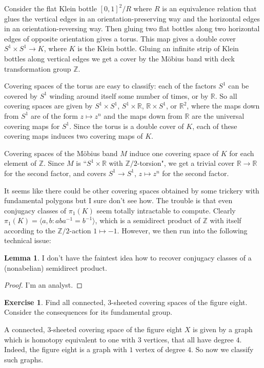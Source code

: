 \documentclass[10pt]{article}
\newcommand{\ZZ}{\mathbb{Z}}
\newcommand{\RR}{\mathbb{R}}
\theoremstyle{definition}
\newtheorem{exer}{Exercise}
\newtheorem{lemma}{Lemma}[exer]
\begin{document}
Consider the flat Klein bottle $[0, 1]^2/R$ where $R$ is an equivalence relation that glues the vertical edges in an orientation-preserving way and the horizontal edges in an orientation-reversing way.
Then gluing two flat bottles along two horizontal edges of opposite orientation gives a torus.
This map gives a double cover $S^1 \times S^1 \to K$, where $K$ is the Klein bottle.
Gluing an infinite strip of Klein bottles along vertical edges we get a cover by the M\"obius band with deck transformation group $\ZZ$.

Covering spaces of the torus are easy to classify: each of the factors $S^1$ can be covered by $S^1$ winding around itself some number of times, or by $\RR$. So all covering spaces are given by $S^1 \times S^1$, $S^1 \times \RR$, $\RR \times S^1$, or $\RR^2$, where the maps down from $S^1$ are of the form $z \mapsto z^n$ and the maps down from $\RR$ are the universal covering maps for $S^1$.
Since the torus is a double cover of $K$, each of these covering maps induces two covering maps of $K$.

Covering spaces of the M\"obius band $M$ induce one covering space of $K$ for each element of $\ZZ$.
Since $M$ is ``$S^1 \times \RR$ with $\ZZ/2$-torsion", we get a trivial cover $\RR \to \RR$ for the second factor, and covers $S^1 \to S^1$, $z \mapsto z^n$ for the second factor.

It seems like there could be other covering spaces obtained by some trickery with fundamental polygons but I sure don't see how.
The trouble is that even conjugacy classes of $\pi_1(K)$ seem totally intractable to compute.
Clearly $\pi_1(K) = \langle a, b: aba^{-1} = b^{-1}\rangle$, which is a semidirect product of $\ZZ$ with itself according to the $\ZZ/2$-action $1 \mapsto -1$.
However, we then run into the following technical issue:
\begin{lemma}
I don't have the faintest idea how to recover conjugacy classes of a (nonabelian) semidirect product.
\end{lemma}
\begin{proof}
I'm an analyst.
\end{proof}

\begin{exer}
Find all connected, $3$-sheeted covering spaces of the figure eight.
Consider the consequences for its fundamental group.
\end{exer}

A connected, $3$-sheeted covering space of the figure eight $X$ is given by a graph which is homotopy equivalent to one with $3$ vertices, that all have degree $4$.
Indeed, the figure eight is a graph with $1$ vertex of degree $4$.
So now we classify such graphs.
\end{document}
